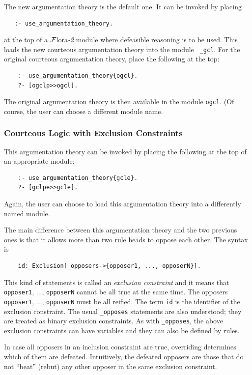 \documentclass[11pt]{article}
\newcommand{\FLORA}{{\mbox{\sc ${\cal F}${lora}\rm\emph{-2}}}\xspace}
\begin{document}
The new argumentation theory is the default one. It can be invoked by placing
\begin{verbatim}
   :- use_argumentation_theory.
\end{verbatim}
at the top of a \FLORA module where defeasible reasoning is to be used.
This loads the new courteous argumentation theory into the module {\tt
  \_gcl}. For the original courteous argumentation theory, place the
following at the top:
\begin{verbatim}
    :- use_argumentation_theory{ogcl}.
    ?- [ogclp>>ogcl].
\end{verbatim}
The original argumentation theory is then available in the module {\tt ogcl}.
(Of course, the user can choose a different module name.

\subsubsection{Courteous Logic with Exclusion Constraints}

This argumentation theory can be invoked by placing the following at the
top of an appropriate module:
\begin{verbatim}
    :- use_argumentation_theory{gcle}.
    ?- [gclpe>>gcle].
\end{verbatim}
Again, the user can choose to load this argumentation theory into a
differently named module.

The main difference between this argumentation theory and the two previous
ones is that it allows more than two rule heads to oppose each other.
The syntax is
\begin{verbatim}
    id:_Exclusion[_opposers->{opposer1, ..., opposerN}].
\end{verbatim}
This kind of statements is called an \emph{exclusion constraint} and it
means that {\tt opposer1}, ..., {\tt opposerN} cannot be all true    
at the same time. The opposers {\tt opposer1}, ..., {\tt opposerN} must be
all reified. The term {\tt id} is the identifier of the
exclusion constraint.
The usual {\tt \_opposes} statements are also understood; they are
treated as binary exclusion constraints.
As with {\tt \_opposes}, the above exclusion constraints can have variables
and they can also be defined by rules.

In case all opposers in an inclusion constraint are true, overriding
determines which of them are defeated.  Intuitively, the defeated opposers
are those that do not ``beat'' (rebut) any other opposer in the same
exclusion constraint.
\end{document}

